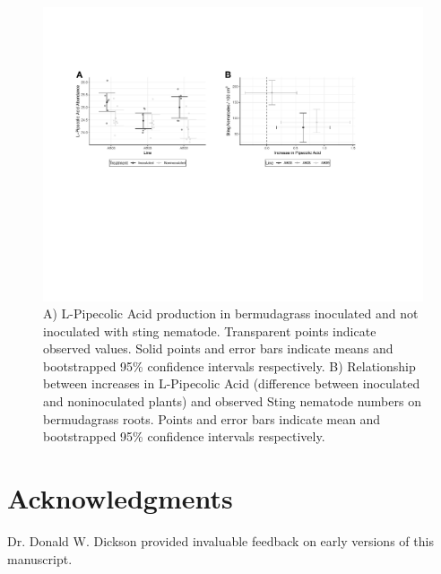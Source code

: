 \documentclass[9pt,lineno]{elife}
\begin{document}
\begin{figure}
\includegraphics[width = 0.95\linewidth]{figures/publication_figures/figure-6.pdf}
\caption{A) L-Pipecolic Acid production in bermudagrass inoculated and not inoculated with sting nematode.  Transparent points indicate observed values.  Solid points and error bars indicate means and bootstrapped 95\% confidence intervals respectively.  B) Relationship between increases in L-Pipecolic Acid (difference between inoculated and noninoculated plants) and observed Sting nematode numbers on bermudagrass roots.  Points and error bars indicate mean and bootstrapped 95\% confidence intervals respectively.   }
\label{fig:figure6}
\end{figure}


\section{Acknowledgments}

Dr. Donald W. Dickson provided invaluable feedback on early versions of this manuscript.  

\nocite{*} %

\end{document}
